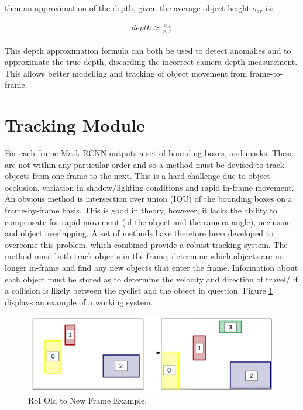 \documentclass[11pt,twoside]{report}
\begin{document}
then an approximation of the depth, given the average object height $o_{av}$ is:

\begin{equation}
\begin{aligned}
depth \approx \frac{o_{av}}{r_{3}A} 
\end{aligned}
\end{equation}

This depth approximation formula can both be used to detect anomalies and to approximate the true depth, discarding the incorrect camera depth measurement. This allows better modelling and tracking of object movement from frame-to-frame.

\section{Tracking Module}

For each frame Mask RCNN outputs a set of bounding boxes, and masks. These are not within any particular order and so a method must be devised to track objects from one frame to the next. This is a hard challenge due to object occlusion, variation in shadow/lighting conditions and rapid in-frame movement. An obvious method is intersection over union (IOU) of the bounding boxes on a frame-by-frame basis. This is good in theory, however, it lacks the ability to compensate for rapid movement (of the object and the camera angle), occlusion and object overlapping. A set of methods have therefore been developed to overcome this problem, which combined provide a robust tracking system.
\newline \newline
The method must both track objects in the frame, determine which objects are no-longer in-frame and find any new objects that enter the frame. Information about each object must be stored as to determine the velocity and direction of travel/ if a collision is likely between the cyclist and the object in question. Figure \ref{roi_match} displays an example of a working system.

\noindent \begin{figure}[h!]
	\includegraphics[width = 1.0\hsize]{figures/roi_match.png}
	\caption{RoI Old to New Frame Example.}
	\label{roi_match}
\end{figure}
\end{document}
